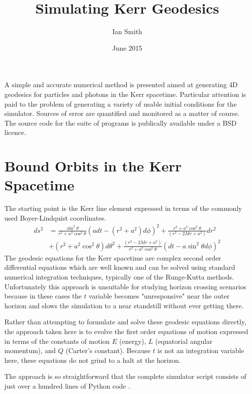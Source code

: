 \documentclass[11pt]{article}
\title{\textbf{Simulating Kerr Geodesics}}
\author{Ian Smith}
\date{June 2015}
\begin{document}
\maketitle

\abstract
A simple and accurate numerical method is presented aimed at generating 4D geodesics for particles and photons in the Kerr spacetime.  Particular attention is paid to the problem of generating a variety of usable initial conditions for the simulator.  Sources of error are quantified and monitored as a matter of course.  The source code for the suite of programs is publically available under a BSD licence.

\section{Bound Orbits in the Kerr Spacetime}

The starting point is the Kerr line element expressed in terms of the commonly used Boyer-Lindquist coordinates.
\begin{equation}
\begin{aligned}
d s^2 &= \frac{ \sin^2 \theta } {r^2 + a^2 \cos^2 \theta} (a dt - (r^2 + a^2)d \phi )^2 + \frac{ r^2 + a^2 \cos^2 \theta } {(r^2 - 2Mr  + a^2)} d r^2 \\
&+ (r^2 + a^2 \cos^2 \theta) d \theta^2 + \frac{ (r^2 - 2Mr  + a^2) } {r^2 + a^2 \cos^2 \theta} (dt - a \sin^2 \theta d \phi )^2
\end{aligned}
\end{equation}
The geodesic equations for the Kerr spacetime are complex second order differential equations which are well known and can be solved using standard numerical integration techniques, typically one of the Runge-Kutta methods.  Unfortunately this approach is unsuitable for studying horizon crossing scenarios because in these cases the $t$ variable becomes "unresponsive" near the outer horizon and slows the simulation to a near standstill without ever getting there.

Rather than attempting to formulate and solve these geodesic equations directly, the approach taken here is to evolve the first order equations of motion expressed in terms of the constants of motion $E$ (energy), $L$ (equatorial angular momentum), and $Q$ (Carter's constant).  Because $t$ is not an integration variable here, these equations do not grind to a halt at the horizon.

The approach is so straightforward that the complete simulator script consists of just over a hundred lines of Python code \cite{m4r35n357}.
\end{document}
